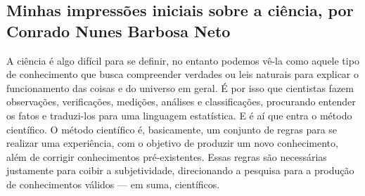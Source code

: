 \subsection{Minhas impressões iniciais sobre a ciência, por Conrado Nunes Barbosa Neto}

A ciência\citep{gnipper_o_nodate} é algo difícil para se definir, no entanto podemos vê-la como aquele tipo de conhecimento que busca compreender verdades ou leis naturais para explicar o funcionamento das coisas e do universo em geral.  É por isso que cientistas fazem observações, verificações, medições, análises e classificações, procurando entender os fatos e traduzi-los para uma linguagem estatística. E é aí que entra o método científico. O método científico é, basicamente, um conjunto de regras para se realizar uma experiência, com o objetivo de produzir um novo conhecimento, além de corrigir conhecimentos pré-existentes. Essas regras são necessárias justamente para coibir a subjetividade, direcionando a pesquisa para a produção de conhecimentos válidos — em suma, científicos. 
